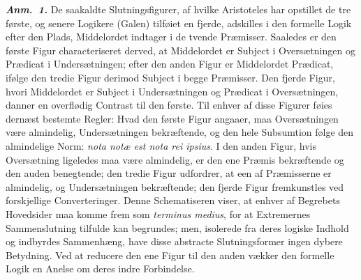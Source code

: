 \documentclass[12pt]{book}
\newcommand{\anm}[1]{\emph{\textbf{Anm.~#1.}}}
\newcommand{\opage}[1]{\marginnote{\footnotesize\textit{[#1]}}}
\begin{document}
\anm{1} De saakaldte Slutningsfigurer, af hvilke Aristoteles har opstillet de tre
første, og senere Logikere (Galen) tilføiet en fjerde, adskilles i den formelle
Logik efter den Plads, Middelordet indtager i de tvende Præmisser. Saaledes er den
første Figur characteriseret derved, at Middelordet er Subject i Oversætningen og
Prædicat i Undersætningen; efter den anden Figur er Middelordet Prædicat, ifølge den
tredie Figur derimod Subject i begge Præmisser. Den fjerde Figur, hvori Middelordet
er Subject i Undersætningen og Prædicat i Oversætningen, danner en overflødig
Contrast til den første. Til enhver af disse Figurer føies dernæst bestemte Regler:
Hvad den første Figur angaaer, maa Oversætningen være almindelig, Undersætningen
bekræftende, og den hele Subsumtion følge den almindelige Norm: \textit{nota notæ
est nota rei ipsius}. I den anden Figur, hvis Oversætning ligeledes maa være
almindelig, er den ene Præmis bekræftende og den auden benegtende; den tredie Figur
udfordrer, at een af Præmisserne er almindelig, og Undersætningen bekræftende; den
fjerde Figur fremkunstles ved forskjellige Converteringer. Denne Schematiseren
viser, at enhver af Begrebets Hovedsider maa komme frem som \textit{terminus
medius}, for at Extremernes Sammenslutning tilfulde kan begrundes; men, isolerede
fra deres logiske Indhold og indbyrdes Sammenhæng, have disse abstracte
Slutningsformer ingen dybere Betydning. Ved at reducere den ene Figur til
\opage{75} den anden vækker den formelle Logik en Anelse om deres indre Forbindelse.
\end{document}
